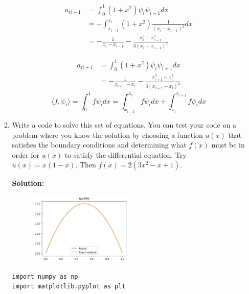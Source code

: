 \documentclass[letterpaper,12pt]{article}
\begin{document}
\begin{enumerate}
\begin{enumerate}
  
\begin{align*}
a_{ii-1} &= \int_0^1 (1+x^2) \psi_i \psi_{i-1} dx\\
  &= -\int_{x_{i-1}}^{x_i} (1+x^2) \frac{1}{(x_i-{x_{i-1}})^2} dx \\
 &=  -\frac{1}{x_i-{x_{i-1}}} -  \frac{x_i^3-{x_{i-1}^3}}{3(x_i-{x_{i-1}})^2}
  \end{align*}
  
 \begin{align*}
a_{ii+1} &= \int_0^1 (1+x^2) \psi_i \psi_{i+1} dx\\
 &=  -\frac{1}{x_{i+1}-{x_{i}}} -  \frac{x_{i+1}^3-{x_{i}^3}}{3(x_{i+1}-{x_{i}})^2}
 \end{align*}
 \[\langle f,\psi_i \rangle =  \int_0^1 f \psi_i dx = \int_{x_{i-1}}^{x_i} f \psi_i dx+ \int_{x_i}^{x_{i+1}} f \psi_i dx \]

 \item
Write a code to solve this set of equations.  You can test your
code on a problem where you know the solution by choosing a function
$u(x)$ that satisfies the boundary conditions and determining what
$f(x)$ must be in order for $u(x)$ to satisfy the differential equation.
Try $u(x) = x(1-x)$.  Then $f(x) = 2(3 x^2 -x + 1)$.

{\bf Solution:}

\begin{figure}[H]

\centering
\includegraphics[width=0.5\textwidth]{41.png}



\end{figure}


	\begin{lstlisting}[style=myPythonstyle]
import numpy as np
import matplotlib.pyplot as plt


\end{lstlisting}
\end{enumerate}
\end{enumerate}
\end{document}
